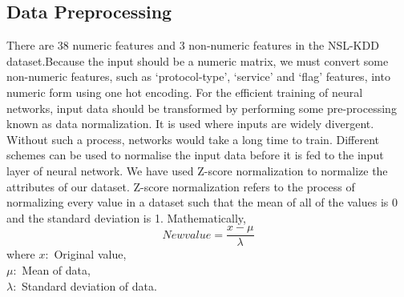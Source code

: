 \subsection{Data Preprocessing}
\vspace{-18pt}
There are 38 numeric features and 3 non-numeric features in the NSL-KDD dataset.Because the input should be a numeric matrix, we must convert some non-numeric features, such as ‘protocol-type’, ‘service’ and ‘flag’ features, into numeric form using one hot encoding. For the efficient training of neural networks, input data should be transformed by performing some pre-processing known as data normalization. It is used where inputs are widely divergent. Without such a process, networks would take a long time to train. Different schemes can be used to normalise the input data before it is fed to the input layer of neural network. We have used Z-score normalization to normalize the attributes of our dataset. Z-score normalization refers to the process of normalizing every value in a dataset such that the mean of all of the values is 0 and the standard deviation is 1. Mathematically,
\begin{equation}
New value = \frac{x- \mu}{\lambda}
\end{equation}
where $x: $ Original value,\\ $\mu: $ Mean of data,\\ $\lambda: $ Standard deviation of data.
